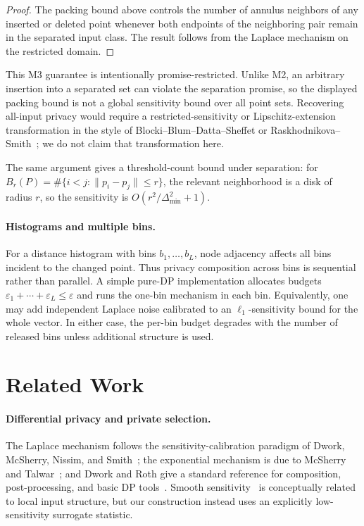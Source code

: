 \documentclass[11pt]{article}
\newcommand{\eps}{\varepsilon}
\begin{document}
\begin{proof}
The packing bound above controls the number of annulus neighbors of any inserted or deleted point whenever both endpoints of the neighboring pair remain in the separated input class. The result follows from the Laplace mechanism on the restricted domain.
\end{proof}

This M3 guarantee is intentionally promise-restricted. Unlike M2, an arbitrary insertion into a separated set can violate the separation promise, so the displayed packing bound is not a global sensitivity bound over all point sets. Recovering all-input privacy would require a restricted-sensitivity or Lipschitz-extension transformation in the style of Blocki--Blum--Datta--Sheffet or Raskhodnikova--Smith~\cite{BBDS13,RS16}; we do not claim that transformation here.

The same argument gives a threshold-count bound under separation: for \(B_r(P)=\#\{i<j:\|p_i-p_j\|\le r\}\), the relevant neighborhood is a disk of radius \(r\), so the sensitivity is \(O(r^2/\Delta_{\min}^2+1)\).

\paragraph{Histograms and multiple bins.}
For a distance histogram with bins \(b_1,\ldots,b_L\), node adjacency affects all bins incident to the changed point. Thus privacy composition across bins is sequential rather than parallel. A simple pure-DP implementation allocates budgets \(\eps_1+\cdots+\eps_L\le \eps\) and runs the one-bin mechanism in each bin. Equivalently, one may add independent Laplace noise calibrated to an \(\ell_1\)-sensitivity bound for the whole vector. In either case, the per-bin budget degrades with the number of released bins unless additional structure is used.



\section{Related Work}
\label{sec:related-work-full}


\paragraph{Differential privacy and private selection.}
The Laplace mechanism follows the sensitivity-calibration paradigm of Dwork, McSherry, Nissim, and Smith~\cite{DMNS06}; the exponential mechanism is due to McSherry and Talwar~\cite{MT07}; and Dwork and Roth give a standard reference for composition, post-processing, and basic DP tools~\cite{DworkRoth14}. Smooth sensitivity~\cite{NRS07} is conceptually related to local input structure, but our construction instead uses an explicitly low-sensitivity surrogate statistic.
\end{document}
